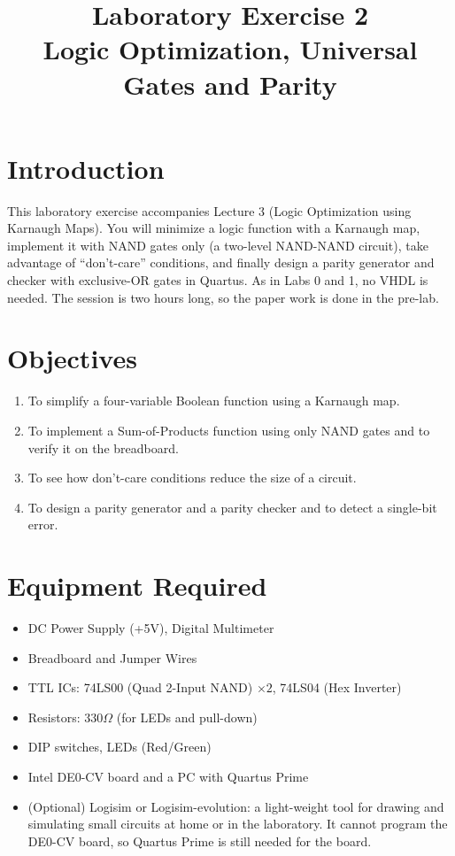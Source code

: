 \documentclass{article}
\title{Laboratory Exercise 2 \\ Logic Optimization, Universal Gates and Parity}
\author{}
\date{}
\begin{document}
\maketitle

\section*{Introduction}
This laboratory exercise accompanies Lecture 3 (Logic Optimization using Karnaugh Maps). You will minimize a logic function with a Karnaugh map, implement it with NAND gates only (a two-level NAND-NAND circuit), take advantage of ``don't-care'' conditions, and finally design a parity generator and checker with exclusive-OR gates in Quartus. As in Labs 0 and 1, no VHDL is needed. The session is two hours long, so the paper work is done in the pre-lab.

\section*{Objectives}
\begin{enumerate}
    \item To simplify a four-variable Boolean function using a Karnaugh map.
    \item To implement a Sum-of-Products function using only NAND gates and to verify it on the breadboard.
    \item To see how don't-care conditions reduce the size of a circuit.
    \item To design a parity generator and a parity checker and to detect a single-bit error.
\end{enumerate}

\section*{Equipment Required}
\begin{itemize}
    \item DC Power Supply (+5V), Digital Multimeter
    \item Breadboard and Jumper Wires
    \item TTL ICs: 74LS00 (Quad 2-Input NAND) $\times 2$, 74LS04 (Hex Inverter)
    \item Resistors: $330\Omega$ (for LEDs and pull-down)
    \item DIP switches, LEDs (Red/Green)
    \item Intel DE0-CV board and a PC with Quartus Prime
    \item (Optional) Logisim or Logisim-evolution: a light-weight tool for drawing and simulating small circuits at home or in the laboratory. It cannot program the DE0-CV board, so Quartus Prime is still needed for the board.
\end{itemize}
\end{document}
